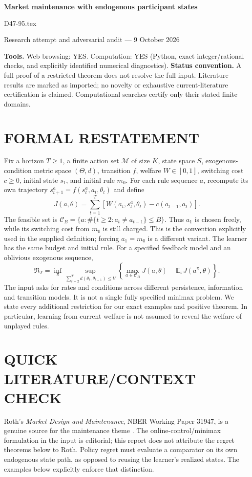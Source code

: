 \documentclass[11pt,a4paper]{article}
\theoremstyle{remark}\newtheorem{remark}[theorem]{Remark}
\newcommand{\E}{\mathbb E}
\begin{document}
\begin{center}
{\LARGE\bfseries Market maintenance with endogenous participant states}\par\medskip
{\large D47-95.tex}\par
Research attempt and adversarial audit --- 9 October 2026
\end{center}
\label{problem:OP-0299}
\label{definitions:problem:30007581}
\textbf{Tools.} Web browsing: YES. Computation: YES (Python, exact integer/rational checks, and explicitly identified numerical diagnostics).
\textbf{Status convention.} A full proof of a restricted theorem does not resolve the full input. Literature results are marked as imported; no novelty or exhaustive current-literature certification is claimed. Computational searches certify only their stated finite domains.

\section{FORMAL RESTATEMENT}
Fix a horizon $T\ge1$, a finite action set $\mathcal M$ of size $K$, state space $S$, exogenous-condition metric space $(\Theta,d)$, transition $f$, welfare $W\in[0,1]$, switching cost $c\ge0$, initial state $s_1$, and initial rule $m_0$. For each rule sequence $a$, recompute its own trajectory $s^a_{t+1}=f(s^a_t,a_t,\theta_t)$ and define
\[
J(a,\theta)=\sum_{t=1}^T[W(a_t,s^a_t,\theta_t)-c(a_{t-1},a_t)].
\]
The feasible set is $\mathcal C_B=\{a:\#\{t\ge2:a_t\ne a_{t-1}\}\le B\}$. Thus $a_1$ is chosen freely, while its switching cost from $m_0$ is still charged. This is the convention explicitly used in the supplied definition; forcing $a_1=m_0$ is a different variant. The learner has the same budget and initial rule. For a specified feedback model and an oblivious exogenous sequence,
\[
\mathfrak R_T=\inf_\pi\sup_{\sum_{t=2}^Td(\theta_t,\theta_{t-1})\le V}
\left\{\max_{a\in\mathcal C_B}J(a,\theta)-\E_\pi J(a^\pi,\theta)\right\}.
\]
The input asks for rates and conditions across different persistence, information and transition models. It is not a single fully specified minimax problem. We state every additional restriction for our exact examples and positive theorem. In particular, learning from current welfare is not assumed to reveal the welfare of unplayed rules.

\section{QUICK LITERATURE/CONTEXT CHECK}
Roth's \emph{Market Design and Maintenance}, NBER Working Paper 31947, is a genuine source for the maintenance theme \cite{roth}. The online-control/minimax formulation in the input is editorial; this report does not attribute the regret theorems below to Roth. Policy regret must evaluate a comparator on its own endogenous state path, as opposed to reusing the learner's realized states. The examples below explicitly enforce that distinction.
\end{document}
